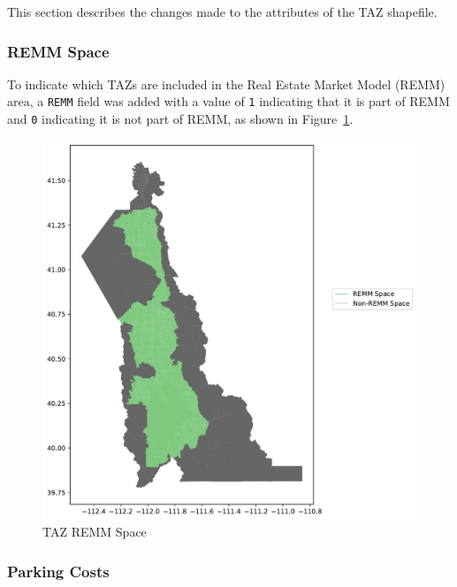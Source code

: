 \documentclass[
  letterpaper,
  DIV=11,
  numbers=noendperiod]{scrreprt}
\begin{document}
This section describes the changes made to the attributes of the TAZ
shapefile.

\hypertarget{remm-space}{%
\subsubsection{REMM Space}\label{remm-space}}

To indicate which TAZs are included in the Real Estate Market Model
(REMM) area, a \texttt{REMM} field was added with a value of \texttt{1}
indicating that it is part of REMM and \texttt{0} indicating it is not
part of REMM, as shown in Figure~\ref{fig-taz-remm-space-pdf}.

\begin{figure}[H]

{\centering \includegraphics{v9x/v900/whats-new/2-inputdata_files/figure-pdf/fig-taz-remm-space-pdf-output-1.pdf}

}

\caption{\label{fig-taz-remm-space-pdf}TAZ REMM Space}

\end{figure}

\hypertarget{parking-costs}{%
\subsubsection{Parking Costs}\label{parking-costs}}
\end{document}

